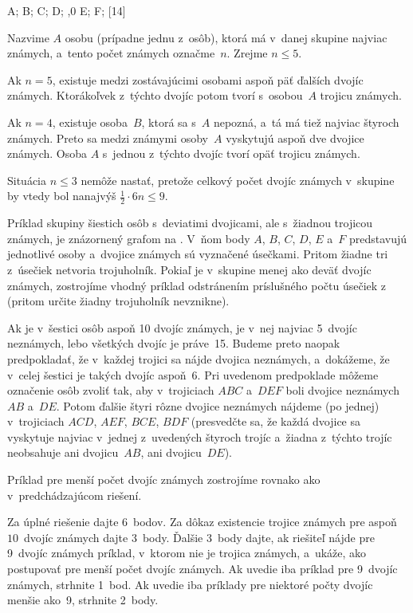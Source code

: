 {%
\fontplace
\tpoint A; \tpoint B; \bpoint C; \bpoint D;
\tpoint{},0 E; \tpoint F;
[14] \hfil\Obr\strut

Nazvime $A$ osobu (prípadne jednu z~osôb), ktorá má v~danej skupine
najviac známych, a~tento počet známych označme~$n$. Zrejme $n\le5$.

Ak $n=5$, existuje medzi zostávajúcimi osobami aspoň päť ďalších dvojíc známych.
Ktorákoľvek z~týchto dvojíc potom tvorí s~osobou~$A$ trojicu známych.

Ak $n=4$, existuje osoba~$B$, ktorá sa s~$A$ nepozná, a~tá má tiež
najviac štyroch známych. Preto
sa medzi známymi osoby~$A$ vyskytujú aspoň dve dvojice známych.
Osoba $A$ s~jednou z~týchto dvojíc tvorí opäť trojicu známych.

Situácia $n\le3$ nemôže nastať, pretože celkový počet dvojíc známych v~skupine
by vtedy bol nanajvýš $\frac12 \cdot6n\le9$.

\inspicture{}
Príklad skupiny šiestich osôb s~deviatimi dvojicami, ale
s~žiadnou trojicou známych, je znázornený grafom na \obr. V~ňom
body $A$, $B$, $C$, $D$, $E$ a~$F$ predstavujú jednotlivé osoby
a~dvojice známych sú vyznačené úsečkami. Pritom žiadne tri z~úsečiek
netvoria trojuholník. Pokiaľ je v~skupine menej ako deväť dvojíc známych,
zostrojíme vhodný príklad odstránením príslušného počtu
úsečiek z~ (pritom určite žiadny trojuholník nevznikne).

\ineriesenie
Ak je v~šestici osôb aspoň 10 dvojíc známych, je v~nej najviac
5~dvojíc neznámych, lebo všetkých dvojíc je práve~15. Budeme
preto naopak predpokladať, že v~každej trojici sa nájde dvojica
neznámych, a~dokážeme, že v~celej šestici je takých dvojíc
aspoň~6. Pri uvedenom predpoklade môžeme označenie osôb zvoliť tak,
aby v~trojiciach $ABC$ a~$DEF$ boli dvojice neznámych $AB$ a~$DE$. Potom
ďalšie štyri rôzne dvojice neznámych nájdeme
(po jednej) v~trojiciach $ACD$, $AEF$, $BCE$, $BDF$ (presvedčte sa,
že každá dvojice sa vyskytuje najviac v~jednej z~uvedených štyroch trojíc
a~žiadna z~týchto trojíc neobsahuje ani dvojicu~$AB$, ani dvojicu~$DE$).

Príklad pre menší počet dvojíc známych zostrojíme rovnako ako v~predchádzajúcom
riešení.

\nobreak\medskip\petit\noindent
Za úplné riešenie dajte 6~bodov.
Za dôkaz existencie trojice známych pre aspoň $10$~dvojíc známych dajte 3~body.
Ďalšie 3~body dajte, ak riešiteľ nájde pre 9~dvojíc známych príklad,
v~ktorom nie je trojica známych,
a~ukáže, ako postupovať pre menší počet dvojíc známych.
Ak uvedie iba príklad pre 9~dvojíc známych, strhnite 1~bod.
Ak uvedie iba príklady pre niektoré počty dvojíc menšie ako~9,
strhnite 2~body.
\endpetit
\bigbreak
}

